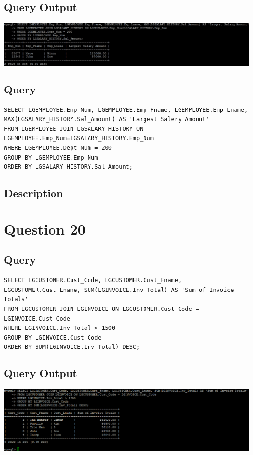 \documentclass[a4paper,10pt]{article}
\begin{document}
\subsection{Query Output}
           \includegraphics{Queries/Question_16_(19)/Q16_screenshot.jpg}
 \subsection{Query}
          \lstset{
            language=SQL,
            breaklines=true
            }
        \begin{lstlisting}[frame=single]
        SELECT LGEMPLOYEE.Emp_Num, LGEMPLOYEE.Emp_Fname, LGEMPLOYEE.Emp_Lname, MAX(LGSALARY_HISTORY.Sal_Amount) AS 'Largest Salery Amount'
FROM LGEMPLOYEE JOIN LGSALARY_HISTORY ON LGEMPLOYEE.Emp_Num=LGSALARY_HISTORY.Emp_Num
WHERE LGEMPLOYEE.Dept_Num = 200
GROUP BY LGEMPLOYEE.Emp_Num
ORDER BY LGSALARY_HISTORY.Sal_Amount;

        \end{lstlisting}
\subsection{Description}
\section*{Question 20}
 \subsection{Query}
          \lstset{
            language=SQL,
            breaklines=true
            }
        \begin{lstlisting}[frame=single]
        SELECT LGCUSTOMER.Cust_Code, LGCUSTOMER.Cust_Fname, LGCUSTOMER.Cust_Lname, SUM(LGINVOICE.Inv_Total) AS 'Sum of Invoice Totals'
FROM LGCUSTOMER JOIN LGINVOICE ON LGCUSTOMER.Cust_Code = LGINVOICE.Cust_Code
WHERE LGINVOICE.Inv_Total > 1500
GROUP BY LGINVOICE.Cust_Code
ORDER BY SUM(LGINVOICE.Inv_Total) DESC;

        \end{lstlisting}
\subsection{Query Output}
           \includegraphics{Queries/Question_20/Question_20_screenshot.PNG}
\end{document}
